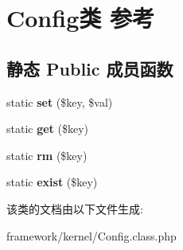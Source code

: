 \hypertarget{classConfig}{\section{Config类 参考}
\label{classConfig}
}
\subsection*{静态 Public 成员函数}
\begin{DoxyCompactItemize}
\item 
\hypertarget{classConfig_a6849a4afeb4cf7e3905861933824cd59}{static {\bfseries set} (\$key, \$val)}\label{classConfig_a6849a4afeb4cf7e3905861933824cd59}

\item 
\hypertarget{classConfig_a31827e08ef05915e5cbe9fab4dbb283b}{static {\bfseries get} (\$key)}\label{classConfig_a31827e08ef05915e5cbe9fab4dbb283b}

\item 
\hypertarget{classConfig_ab4abf94b1b9efc4c85187cd4b256a80b}{static {\bfseries rm} (\$key)}\label{classConfig_ab4abf94b1b9efc4c85187cd4b256a80b}

\item 
\hypertarget{classConfig_a9b8aeccd062cd33d37b8f90dd4b4c6d5}{static {\bfseries exist} (\$key)}\label{classConfig_a9b8aeccd062cd33d37b8f90dd4b4c6d5}

\end{DoxyCompactItemize}


该类的文档由以下文件生成\+:\begin{DoxyCompactItemize}
\item 
framework/kernel/Config.\+class.\+php\end{DoxyCompactItemize}
